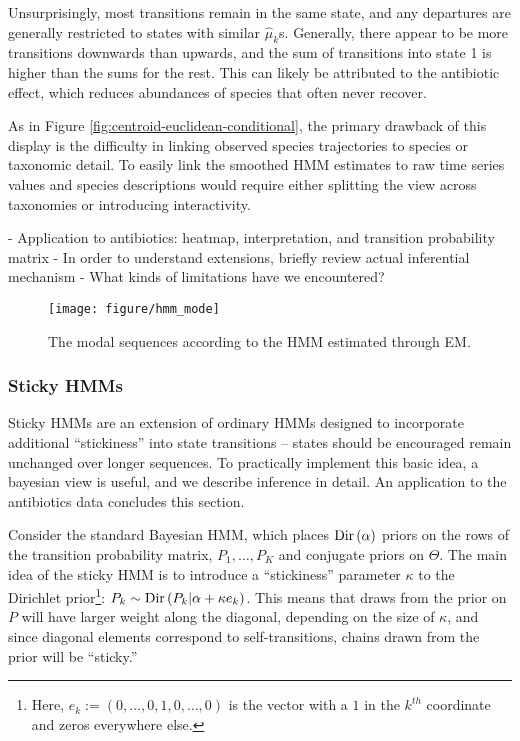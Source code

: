 \documentclass[14pt]{extreport}
\begin{document}
Unsurprisingly, most transitions remain in the same state, and any departures
are generally restricted to states with similar $\hat{\mu}_{k}$s. Generally,
there appear to be more transitions downwards than upwards, and the sum of
transitions into state 1 is higher than the sums for the rest. This can likely
be attributed to the antibiotic effect, which reduces abundances of species that
often never recover.

As in Figure \ref{fig:centroid-euclidean-conditional}, the primary drawback of
this display is the difficulty in linking observed species trajectories to
species or taxonomic detail. To easily link the smoothed HMM estimates to raw
time series values and species descriptions would require either splitting the
view across taxonomies or introducing interactivity.

- Application to antibiotics: heatmap, interpretation, and transition
probability matrix
- In order to understand extensions, briefly review actual inferential mechanism
- What kinds of limitations have we encountered?

\begin{figure}
  \centering
  \texttt{[image: figure/hmm\_mode]}
  \caption{The modal sequences according to the HMM estimated through
    EM. \label{fig:hmm_mode} }
\end{figure}

\subsubsection{Sticky HMMs}
\label{sec:sticky_hmms}

Sticky HMMs are an extension of ordinary HMMs designed to incorporate
additional ``stickiness'' into state transitions -- states should be encouraged
remain unchanged over longer sequences. To practically implement this basic
idea, a bayesian view is useful, and we describe inference in detail. An
application to the antibiotics data concludes this section.

Consider the standard Bayesian HMM, which places $\textnormal{Dir}\left(\alpha\right)$
priors on the rows of the transition probability matrix, $P_{1}, \dots, P_{K}$
and conjugate priors on $\Theta$. The main idea of the sticky HMM is to
introduce a ``stickiness'' parameter $\kappa$ to the Dirichlet
prior\footnote{Here, $e_{k} := \left(0, \dots, 0, 1, 0, \dots, 0\right)$ is the
  vector with a $1$ in the $k^{th}$ coordinate and zeros everywhere else.}:
$P_{k} \sim \textnormal{Dir}\left(P_{k} \vert \alpha + \kappa e_{k}\right)$. This means that
draws from the prior on $P$ will have larger weight along the diagonal,
depending on the size of $\kappa$, and since diagonal elements correspond to
self-transitions, chains drawn from the prior will be ``sticky.''
\end{document}
